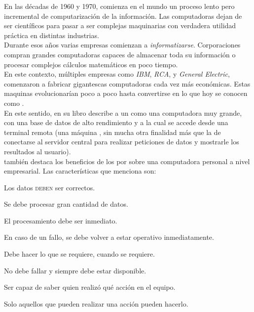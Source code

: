 En las décadas de 1960 y 1970, comienza en el mundo un proceso lento pero
incremental de computarización de la información. Las computadoras dejan de ser
 científicos para pasar a ser complejas maquinarias con
verdadera utilidad práctica en distintas industrias.\\
Durante esos años varias empresas comienzan a \emph{informatizarse}. 
Corporaciones compran grandes computadoras capaces de almacenar toda su
información o procesar complejos cálculos matemáticos en poco tiempo.\\
En este contexto, múltiples empresas como \emph{IBM}, \emph{RCA}, y 
\emph{General Electric}, comenzaron a fabricar gigantescas computadoras cada vez más económicas. Estas maquinas evolucionarían poco a poco hasta
convertirse en lo que hoy se conocen como \mainframes.\\
En este sentido,  en su libro
  describe a un
\mainframe como una computadora muy grande, con una base de datos de alto
rendimiento y a la cual se accede desde una terminal remota (una máquina 
, sin mucha otra finalidad más que la de conectarse al servidor 
central para realizar peticiones de datos y mostrarle los resultados
al usuario).\\
\citeauthor{Stephens:2008:BOOK} también destaca los beneficios de los
\mainframes por sobre una computadora personal a nivel empresarial. Las
características que menciona son:
\begin{description}[
	font=$\bullet$\enskip,
	leftmargin={\parindent*4},
	labelindent=\parindent]
	\setlength{\itemsep}{1pt}
	\setlength{\parskip}{0pt}
	\setlength{\parsep}{0pt}
	\item[Integridad de datos:] Los datos \textsc{deben} ser correctos.
	\item[Rendimiento:] Se debe procesar gran cantidad de datos.
	\item[Respuesta:] El procesamiento debe ser inmediato.
	\item[Recuperación ante desastres:] En caso de un fallo, se debe volver a
										estar operativo inmediatamente.
	\item[Usabilidad:] Debe hacer lo que se requiere, cuando se requiere.
	\item[Confiabilidad:] No debe fallar y siempre debe estar disponible.
	\item[Auditoria:] Ser capaz de saber quien realizó qué acción en el equipo.
	\item[Seguridad:] Solo aquellos que pueden realizar una acción pueden
					  hacerlo.
\end{description}
